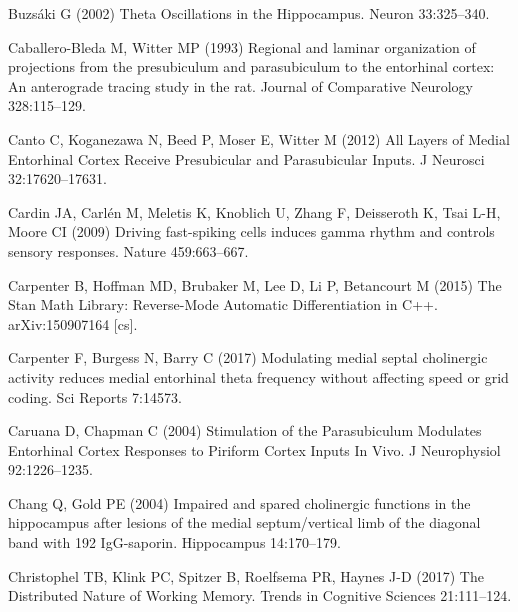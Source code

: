\documentclass[
  12pt,
  a4paper,
  openany]{book}
\newlength{\cslhangindent}
\newlength{\cslentryspacingunit} %
\newenvironment{CSLReferences}[2] %
 {%
  \setlength{\parindent}{0pt}
  \ifodd #1
  \let\oldpar\par
  \def\par{\hangindent=\cslhangindent\oldpar}
  \fi
  \setlength{\parskip}{#2\cslentryspacingunit}
 }%
 {}
\begin{document}
\begin{CSLReferences}{1}{0}
\leavevmode{}%
Buzsáki G (2002) Theta {Oscillations} in the {Hippocampus}. Neuron 33:325--340.

\leavevmode{}%
Caballero-Bleda M, Witter MP (1993) Regional and laminar organization of projections from the presubiculum and parasubiculum to the entorhinal cortex: {An} anterograde tracing study in the rat. Journal of Comparative Neurology 328:115--129.

\leavevmode{}%
Canto C, Koganezawa N, Beed P, Moser E, Witter M (2012) All {Layers} of {Medial} {Entorhinal} {Cortex} {Receive} {Presubicular} and {Parasubicular} {Inputs}. J Neurosci 32:17620--17631.

\leavevmode{}%
Cardin JA, Carlén M, Meletis K, Knoblich U, Zhang F, Deisseroth K, Tsai L-H, Moore CI (2009) Driving fast-spiking cells induces gamma rhythm and controls sensory responses. Nature 459:663--667.

\leavevmode{}%
Carpenter B, Hoffman MD, Brubaker M, Lee D, Li P, Betancourt M (2015) The {Stan} {Math} {Library}: {Reverse}-{Mode} {Automatic} {Differentiation} in {C}++. arXiv:150907164 {[}cs{]}.

\leavevmode{}%
Carpenter F, Burgess N, Barry C (2017) Modulating medial septal cholinergic activity reduces medial entorhinal theta frequency without affecting speed or grid coding. Sci Reports 7:14573.

\leavevmode{}%
Caruana D, Chapman C (2004) Stimulation of the {Parasubiculum} {Modulates} {Entorhinal} {Cortex} {Responses} to {Piriform} {Cortex} {Inputs} {In} {Vivo}. J Neurophysiol 92:1226--1235.

\leavevmode{}%
Chang Q, Gold PE (2004) Impaired and spared cholinergic functions in the hippocampus after lesions of the medial septum/vertical limb of the diagonal band with 192 {IgG}-saporin. Hippocampus 14:170--179.

\leavevmode{}%
Christophel TB, Klink PC, Spitzer B, Roelfsema PR, Haynes J-D (2017) The {Distributed} {Nature} of {Working} {Memory}. Trends in Cognitive Sciences 21:111--124.


\end{CSLReferences}
\end{document}
